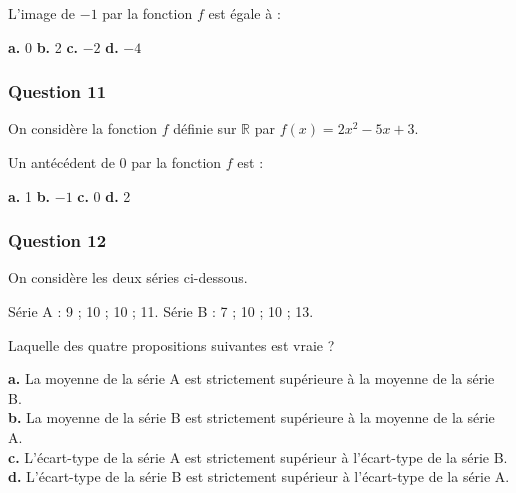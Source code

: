 L'image de $-1$ par la fonction $f$ est égale à :

\textbf{a.} 0 \hfill \textbf{b.} 2 \hfill \textbf{c.} $-2$ \hfill \textbf{d.} $-4$

\subsubsection*{Question 11}
On considère la fonction $f$ définie sur $\mathbb{R}$ par $f(x) = 2x^2 - 5x + 3$.

Un antécédent de 0 par la fonction $f$ est :

\textbf{a.} 1 \hfill \textbf{b.} $-1$ \hfill \textbf{c.} 0 \hfill \textbf{d.} 2

\subsubsection*{Question 12}
On considère les deux séries ci-dessous.

Série A : 9 ; 10 ; 10 ; 11. \hfill Série B : 7 ; 10 ; 10 ; 13.

Laquelle des quatre propositions suivantes est vraie ?

\textbf{a.} La moyenne de la série A est strictement supérieure à la moyenne de la série B. \\
\textbf{b.} La moyenne de la série B est strictement supérieure à la moyenne de la série A. \\
\textbf{c.} L'écart-type de la série A est strictement supérieur à l'écart-type de la série B. \\
\textbf{d.} L'écart-type de la série B est strictement supérieur à l'écart-type de la série A.
